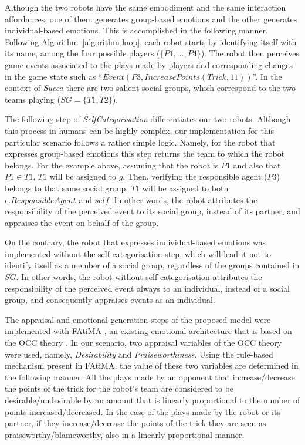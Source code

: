 Although the two robots have the same embodiment and the same interaction affordances, one of them generates group-based emotions and the other generates individual-based emotions. This is accomplished in the following manner. Following Algorithm~\ref{algorithm-loop}, each robot starts by identifying itself with its name, among the four possible players ($\{P1,...,P4\}$).
The robot then perceives game events associated to the plays made by players and corresponding changes in the game state such as ``$Event(P3,IncreasePoints(Trick, 11))$''. In the context of \textit{Sueca} there are two salient social groups, which correspond to the two teams playing ($SG = \{T1, T2\}$). 



The following step of \textit{SelfCategorisation} differentiates our two robots. Although this process in humans can be highly complex, our implementation for this particular scenario follows a rather simple logic. Namely, for the robot that expresses group-based emotions this step returns the team to which the robot belongs. For the example above, assuming that the robot is $P1$ and also that $P1 \in T1$, $T1$ will be assigned to $g$. Then, verifying the responsible agent ($P3$) belongs to that same social group, $T1$ will be assigned to both $e.ResponsibleAgent$ and $self$. In other words, the robot attributes the responsibility of the perceived event to its social group, instead of its partner, and appraises the event on behalf of the group.

On the contrary, the robot that expresses individual-based emotions was implemented without the self-categorisation step, which will lead it not to identify itself as a member of a social group, regardless of the groups contained in $SG$. In other words, the robot without self-categorisation attributes the responsibility of the perceived event always to an individual, instead of a social group, and consequently appraises events as an individual.

The appraisal and emotional generation steps of the proposed model were implemented with FAtiMA \cite{dias2014fatima}, an existing emotional architecture that is based on the OCC theory \cite{ortony1990cognitive}. In our scenario, two appraisal variables of the OCC theory were used, namely, \textit{Desirability} and \textit{Praiseworthiness}. Using the rule-based mechanism present in FAtiMA, the value of these two variables are determined in the following manner. All the plays made by an opponent that increase/decrease the points of the trick for the robot's team are considered to be desirable/undesirable by an amount that is linearly proportional to the number of points increased/decreased. In the case of the plays made by the robot or its partner, if they increase/decrease the points of the trick they are seen as praiseworthy/blameworthy, also in a linearly proportional manner. 

